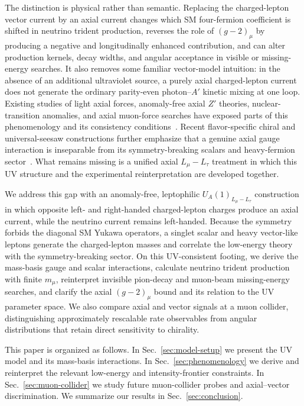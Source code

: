 \documentclass[onecolumn, aps, nofootinbib, prd, preprint, floats, floatfix, amsmath, amssymb, superscriptaddress, preprintnumbers]{revtex4-2}
\begin{document}
The distinction is physical rather than semantic. Replacing the charged-lepton vector current by an axial current changes which SM four-fermion coefficient is shifted in neutrino trident production, reverses the role of $(g-2)_\mu$ by producing a negative and longitudinally enhanced contribution, and can alter production kernels, decay widths, and angular acceptance in visible or missing-energy searches. It also removes some familiar vector-model intuition: in the absence of an additional ultraviolet source, a purely axial charged-lepton current does not generate the ordinary parity-even photon--$A'$ kinetic mixing at one loop. Existing studies of light axial forces, anomaly-free axial $Z'$ theories, nuclear-transition anomalies, and axial muon-force searches have exposed parts of this phenomenology and its consistency conditions~\cite{Kahn:2016vjr,Ismail:2016tod,Kozaczuk:2016nma,Hicyilmaz:2022owb,Batell:2011qq,Davoudiasl:2012ag,Fayet:2020bmb,Baruch:2022esd,Fayet:2024ddk}. Recent flavor-specific chiral and universal-seesaw constructions further emphasize that a genuine axial gauge interaction is inseparable from its symmetry-breaking scalars and heavy-fermion sector~\cite{Prajapati:2026tfv,Dutta:2026dnf}. What remains missing is a unified axial $L_\mu-L_\tau$ treatment in which this UV structure and the experimental reinterpretation are developed together.

We address this gap with an anomaly-free, leptophilic $U_A(1)_{L_\mu-L_\tau}$ construction in which opposite left- and right-handed charged-lepton charges produce an axial current, while the neutrino current remains left-handed. Because the symmetry forbids the diagonal SM Yukawa operators, a singlet scalar and heavy vector-like leptons generate the charged-lepton masses and correlate the low-energy theory with the symmetry-breaking sector. On this UV-consistent footing, we derive the mass-basis gauge and scalar interactions, calculate neutrino trident production with finite $m_\mu$, reinterpret invisible pion-decay and muon-beam missing-energy searches, and clarify the axial $(g-2)_\mu$ bound and its relation to the UV parameter space. We also compare axial and vector signals at a muon collider, distinguishing approximately rescalable rate observables from angular distributions that retain direct sensitivity to chirality.

This paper is organized as follows. In Sec.~\ref{sec:model-setup} we present the UV model and its mass-basis interactions. In Sec.~\ref{sec:phenomenology} we derive and reinterpret the relevant low-energy and intensity-frontier constraints. In Sec.~\ref{sec:muon-collider} we study future muon-collider probes and axial--vector discrimination. We summarize our results in Sec.~\ref{sec:conclusion}.
\end{document}
